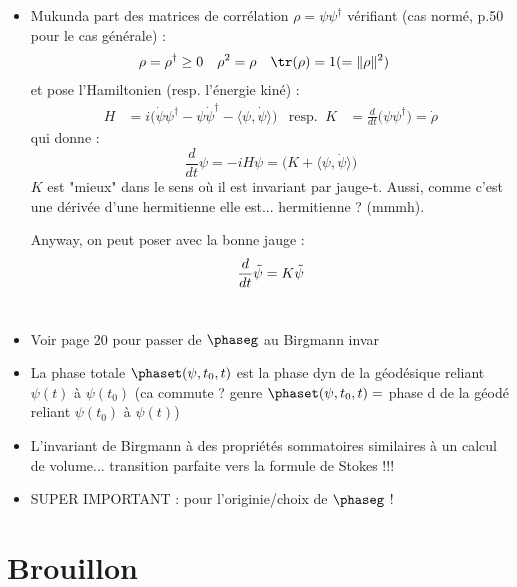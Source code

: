 \begin{itemize}
	\item Mukunda \cite[p. 10]{mukunda_quantum_1993} part des matrices de corrélation $\rho = \psi\psi^\dagger$ vérifiant (cas normé, p.50 pour le cas générale) :
	\begin{align*}
		\rho &= \rho^\dagger \geq 0  &  \rho^2 &= \rho  &  \tr(\rho) &= 1 (=\|\rho\|^2)
	\end{align*}
	et pose l'Hamiltonien  (resp. l'énergie kiné) :
	\begin{align*}
		H &= i\big( \dot{\psi} \psi^\dagger - \psi\dot{\psi}^\dagger - \langle \psi, \dot{\psi}\rangle\big)  &  \text{resp. }\ K &= \frac{d}{dt}\big( \psi\psi^\dagger \big) = \dot{\rho}
	\end{align*}
	qui donne :
	\[\frac{d}{dt}\psi = -i H\psi = \big( K + \langle\psi, \dot{\psi}\rangle \big)\]
	$K$ est "mieux" dans le sens où il est invariant par jauge-t. Aussi, comme c'est une dérivée d'une hermitienne elle est... hermitienne ? (mmmh).
	
	Anyway, on peut poser avec la bonne jauge :
	\[\frac{d}{dt}\Tilde{\psi} = K\Tilde{\psi}\]
	\\
	
	\item Voir page 20 pour passer de $\phaseg$ au Birgmann invar
	\\
	
	\item La phase totale $\phaset(\psi,t_0,t)$ est la phase dyn de la géodésique reliant $\psi(t)$ à $\psi(t_0)$ (ca commute ? genre $\phaset(\psi,t_0,t)=$ phase d de la géodé reliant $\psi(t_0)$ à $\psi(t)$)
	
	\item L'invariant de Birgmann à des propriétés sommatoires similaires à un calcul de volume... transition parfaite vers la formule de Stokes !!!
	
	\item SUPER IMPORTANT : \cite[(8.6),p.51]{mukunda_quantum_1993} pour l'originie/choix de $\phaseg$ !
\end{itemize}







\setcounter{figure}{0}
\setcounter{lstlisting}{0}

\part{Brouillon}

